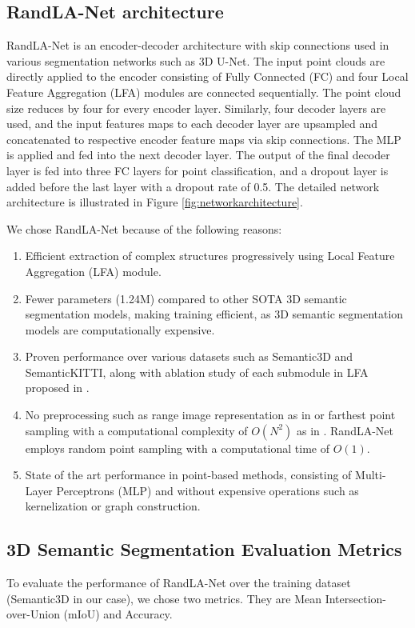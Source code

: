 \subsection{RandLA-Net architecture}
RandLA-Net is an encoder-decoder architecture with skip connections used in various segmentation networks such as 3D U-Net\cite{wang2018two_3DUnet}.
The input point clouds are directly applied to the encoder consisting of Fully Connected (FC) and four Local Feature Aggregation (LFA) modules are connected sequentially.
The point cloud size reduces by four for every encoder layer. 
Similarly, four decoder layers are used, and the input features maps to each decoder layer are upsampled and concatenated to respective encoder feature maps via skip connections.
The MLP is applied and fed into the next decoder layer.
The output of the final decoder layer is fed into three FC layers for point classification, and a dropout layer is added before the last layer with a dropout rate of 0.5.
The detailed network architecture is illustrated in Figure \ref{fig:networkarchitecture}.

We chose RandLA-Net because of the following reasons:
\begin{enumerate}
    \item Efficient extraction of complex structures progressively using Local Feature Aggregation (LFA) module.
    \item Fewer parameters (1.24M) compared to other SOTA 3D semantic segmentation models, making training efficient, as 3D semantic segmentation models are computationally expensive.
    \item Proven performance over various datasets such as Semantic3D and SemanticKITTI, along with ablation study of each submodule in LFA proposed in \cite{Hu_2020_CVPR_Randla}.
    \item No preprocessing such as range image representation as in \cite{Milioto2019} or farthest point sampling with a computational complexity of $O(N^2)$ as in \cite{Qi_2017_CVPR_pointnet}. RandLA-Net employs random point sampling with a computational time of $O(1)$.
    \item State of the art performance in point-based methods, consisting of Multi-Layer Perceptrons (MLP) and without expensive operations such as kernelization or graph construction.
\end{enumerate}

\subsection{3D Semantic Segmentation Evaluation Metrics}
To evaluate the performance of RandLA-Net over the training dataset (Semantic3D in our case), we chose two metrics.
They are Mean Intersection-over-Union (mIoU) and Accuracy.

